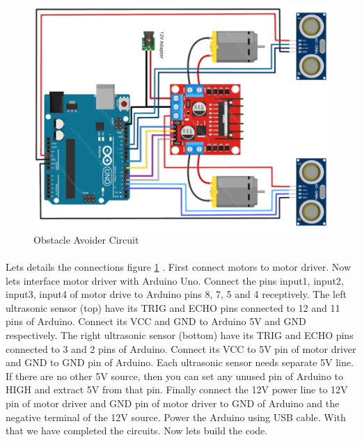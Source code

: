 \begin{figure}
    \centering
    \includegraphics{Images/Ultrasonic/obj_avoider_ckt.png}
     \caption{Obstacle Avoider Circuit}
	\label{fig:ckt_avoider}
\end{figure}

\paragraph{ } Lets details the connections figure \ref{fig:ckt_avoider} . First connect motors to motor driver. Now lets interface motor driver with Arduino Uno. Connect the pins input1, input2, input3, input4 of motor drive to Arduino pins 8, 7, 5 and 4 receptively. The left ultrasonic sensor (top) have its TRIG and ECHO pins connected to 12 and 11 pins of Arduino. Connect its VCC and GND to Arduino 5V and GND respectively. The right ultrasonic sensor (bottom) have its TRIG and ECHO pins connected to 3 and 2 pins of Arduino. Connect its VCC to 5V pin of motor driver and GND to GND pin of Arduino. Each ultrasonic sensor needs separate 5V line. If there are no other 5V source, then you can set any unused pin of Arduino to HIGH and extract 5V from that pin. Finally connect the 12V power line to 12V pin of motor driver and GND pin of motor driver to GND of Arduino and the negative terminal of the 12V source. Power the Arduino using USB cable. With that we have completed the circuits. Now lets build the code. \\

